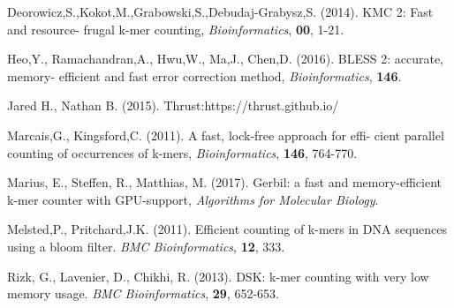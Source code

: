 \documentclass{bioinfo}
\begin{document}
\begin{thebibliography}{}

Deorowicz,S.,Kokot,M.,Grabowski,S.,Debudaj-Grabysz,S. (2014). KMC 2: Fast and resource-
frugal k-mer counting, {\it Bioinformatics}, {\bf 00}, 1-21.

Heo,Y., Ramachandran,A., Hwu,W., Ma,J., Chen,D. (2016). BLESS 2: accurate, memory-
efficient and fast error correction method, {\it Bioinformatics}, {\bf 146}.

Jared H., Nathan B. (2015). Thrust:https://thrust.github.io/

Marcais,G., Kingsford,C. (2011).  A fast, lock-free approach for effi-
cient parallel counting of occurrences of k-mers, {\it Bioinformatics}, {\bf 146},
764-770.

Marius, E., Steffen, R., Matthias, M. (2017). Gerbil: a fast and memory-efficient k-mer
counter with GPU-support, {\it Algorithms for Molecular Biology}.

Melsted,P., Pritchard,J.K. (2011). Efficient counting of k-mers in DNA sequences
using a bloom filter. {\it BMC Bioinformatics}, {\bf 12}, 333.

Rizk, G., Lavenier, D., Chikhi, R. (2013). DSK: k-mer counting with very low memory usage.
{\it BMC Bioinformatics}, {\bf 29}, 652-653.

\end{thebibliography}
\end{document}

